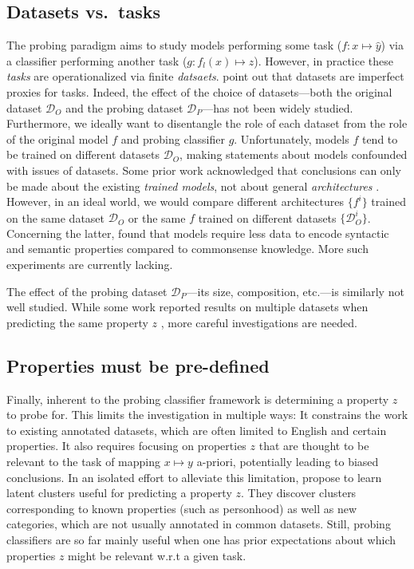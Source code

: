\documentclass[discussion]{clv3}
\begin{document}
\subsection{Datasets vs.\ tasks}


The probing paradigm aims to study models performing some task ($f : x \mapsto \hat{y}$) via a classifier performing another task ($g: f_l(x) \mapsto \hat{z}$). However, in practice these \emph{tasks} are operationalized via finite \emph{datsaets}. 
\citet{ravichander:2021:eacl}  point out that datasets are imperfect proxies for tasks. 
Indeed, 
the effect of the choice of datasets---both the original dataset $\mathcal{D}_O$ and the probing dataset $\mathcal{D}_P$---has not been widely studied. Furthermore, we ideally want to disentangle the role of each dataset from the role of the original model $f$ and probing classifier $g$. 
Unfortunately, models $f$ tend to be trained on different datasets $\mathcal{D}_O$, making statements about models confounded with issues of datasets. Some prior work acknowledged that conclusions can only be made about the existing \emph{trained models}, not about general \emph{architectures} \cite{liu-etal-2019-linguistic}. 
However, in an ideal world, we would compare different architectures $\{f^i\}$ trained on the same dataset $\mathcal{D}_O$  or the same  $f$ trained on different datasets $\{\mathcal{D}_O^i\}$. 
Concerning the latter, \citet{zhang-etal-2021-need} found that models require less data to encode syntactic and semantic properties compared to commonsense knowledge.
More such experiments are currently lacking.  

The effect of the probing dataset $\mathcal{D}_P$---its size, composition, etc.---is similarly not well studied. While some work reported results on multiple datasets when predicting the same property $z$ \cite[e.g.,][]{belinkov-etal-2017-neural}, more careful investigations are needed. 


\subsection{Properties must be pre-defined}


Finally, 
inherent to the probing classifier framework is determining a property $z$ to probe for. This limits the investigation in multiple ways: It constrains the work to existing annotated datasets, which are often limited to English and certain properties. It also requires focusing on properties $z$ that are thought to be relevant to the task of mapping $x \mapsto y$ a-priori, potentially leading to biased conclusions.
In an isolated effort to alleviate this limitation, \citet{michael-etal-2020-asking} propose to learn latent clusters useful for predicting a property $z$. They discover clusters corresponding to known properties (such as personhood) as well as new categories, which are not usually annotated in common datasets. Still, probing classifiers are so far mainly useful when one has prior expectations about which properties $z$ might be relevant w.r.t a given task. 
\end{document}
